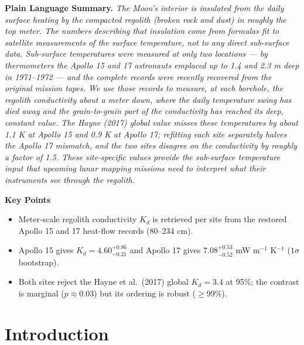 \documentclass[11pt]{article}
\newenvironment{plainlanguagesummary}{%
  \par\medskip\noindent\textbf{Plain Language Summary.}\itshape\small}{\par\medskip}
\begin{document}
\begin{plainlanguagesummary}
The Moon's interior is insulated from the daily surface heating by the
compacted regolith (broken rock and dust) in roughly the top meter. The
numbers describing that insulation come from formulas fit to satellite
measurements of the surface temperature, not to any direct sub-surface
data. Sub-surface temperatures were measured at only two locations --- by
thermometers the Apollo 15 and 17 astronauts emplaced up to 1.4 and
2.3 m deep in 1971--1972 --- and the complete records were recently
recovered from the original mission tapes. We use those records to
measure, at each borehole, the regolith conductivity about a meter down,
where the daily temperature swing has died away and the grain-to-grain
part of the conductivity has reached its deep, constant value. The
Hayne (2017) global value misses these temperatures by about 1.1 K at
Apollo 15 and 0.9 K at Apollo 17; refitting each site separately halves
the Apollo 17 mismatch, and the two sites disagree on the conductivity
by roughly a factor of 1.5. These site-specific values provide the
sub-surface temperature input that upcoming lunar mapping missions need
to interpret what their instruments see through the regolith.
\end{plainlanguagesummary}

\medskip
\noindent\textbf{Key Points}
\begin{itemize}\itemsep2pt
  \item Meter-scale regolith conductivity
        $K_d$ is retrieved per site from the restored Apollo 15 and 17
        heat-flow records (80--234 cm).
  \item Apollo 15 gives
        $K_d=4.60^{+0.86}_{-0.21}$ and Apollo 17 gives
        $7.08^{+0.53}_{-0.52}$ mW m$^{-1}$ K$^{-1}$ ($1\sigma$
        bootstrap).
  \item Both sites reject the Hayne et al.\ (2017) global $K_d{=}3.4$
        at 95\%; the contrast is marginal ($p{\approx}0.03$) but its
        ordering is robust ($\ge$99\%).
\end{itemize}


\section{Introduction}\label{sec:intro}
\end{document}
